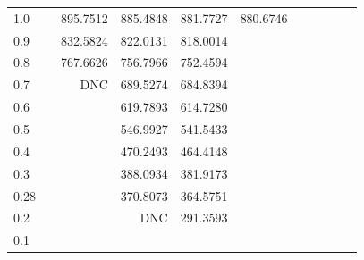 \begin{landscape}
\begin{table}
\begin{center}
\begin{tabular}{l|rrrrrrrrrr}
1.0 & 			&  895.7512 &  885.4848 &  881.7727 &  880.6746 &    \\ 
0.9 & 			&  832.5824 &  822.0131 &  818.0014 &   \\ 
0.8 & 			&  767.6626 &  756.7966 &  752.4594  \\ 
0.7 & 			&       DNC &  689.5274 &  684.8394  \\ 
0.6 & 			& 			& 619.7893 & 614.7280  \\ 
0.5 & 			& 			& 546.9927 & 541.5433  \\ 
0.4 & 			& 			& 470.2493 & 464.4148  \\ 
0.3 & 			& 			& 388.0934 & 381.9173  \\ 
0.28 & 			& 			& 370.8073 & 364.5751  \\ 
0.2 & 			& 			& DNC & 291.3593  \\ 
0.1 & 			& 			& 			&  \\ 
\hline \hline
\end{tabular}
\end{center}
\end{table}
\end{landscape}


